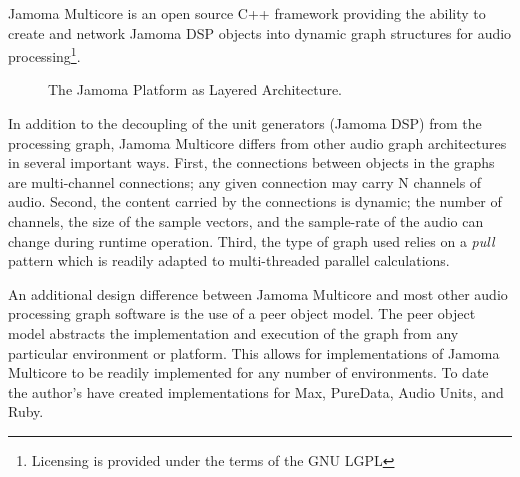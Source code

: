 \documentclass[twoside,a4paper]{article}
\begin{document}
Jamoma Multicore is an open source C++ framework providing the ability to create and network Jamoma DSP objects into dynamic graph structures for audio processing\footnote{Licensing is provided under the terms of the GNU LGPL}.  

\begin{figure}[htbp]
\centerline{}
\caption{The Jamoma Platform as Layered Architecture.}
\label{fig:layers}
\end{figure}

In addition to the decoupling of the unit generators (Jamoma DSP) from the processing graph, Jamoma Multicore differs from other audio graph architectures in several important ways.  First, the connections between objects in the graphs are multi-channel connections; any given connection may carry N channels of audio.  Second, the content carried by the connections is dynamic; the number of channels, the size of the sample vectors, and the sample-rate of the audio can change during runtime operation.  Third, the type of graph used relies on a \emph{pull} pattern which is readily adapted to multi-threaded parallel calculations.

An additional design difference between Jamoma Multicore and most other audio processing graph software is the use of a peer object model.  The peer object model abstracts the implementation and execution of the graph from any particular environment or platform.  This allows for implementations of Jamoma Multicore to be readily implemented for any number of environments.  To date the author's have created implementations for Max, PureData, Audio Units, and Ruby.

%
%  
%
\end{document}
